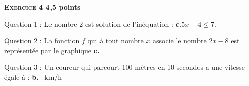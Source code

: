 \textbf{\textsc{Exercice 4} \hfill 4,5 points}

\medskip

Question 1 : Le nombre 2 est solution de l'inéquation : \textbf{c.}\quad  $5x - 4 \leqslant  7$.

Question 2 : La fonction $f$ qui à tout nombre $x$ associe le nombre $2 x - 8$ est représentée par le graphique \textbf{c.}

Question 3 : Un coureur qui parcourt 100 mètres en 10 secondes a une vitesse égale à : \textbf{b.} ~km/h

\vspace{0,5cm}

